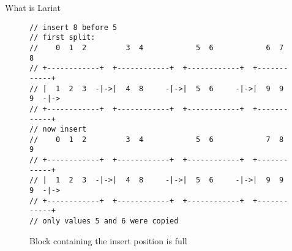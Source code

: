 \begin{section}{What is Lariat}
 \begin{figure}[h]
	 \begin{verbatim}
// insert 8 before 5
// first split:
//    0  1  2         3  4            5  6            6  7  8       
// +------------+  +------------+  +------------+  +------------+  
// |  1  2  3  -|->|  4  8     -|->|  5  6     -|->|  9  9  9  -|->
// +------------+  +------------+  +------------+  +------------+  
// now insert
//    0  1  2         3  4            5  6            7  8  9       
// +------------+  +------------+  +------------+  +------------+    
// |  1  2  3  -|->|  4  8     -|->|  5  6     -|->|  9  9  9  -|->
// +------------+  +------------+  +------------+  +------------+    
// only values 5 and 6 were copied
	\end{verbatim}
	 \caption{Block containing the insert position is full}
	 \label{fig:whatlariat2}
 \end{figure}

\end{section}
